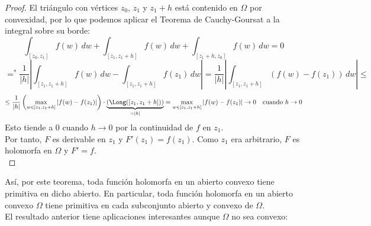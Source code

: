 \begin{proof}
    El triángulo con vértices $z_0$, $z_1$ y $z_1 + h$ está contenido en $\Omega$ por convexidad, por lo que podemos aplicar el Teorema de Cauchy-Goursat a la integral sobre su borde:
    \[
    \int_{[z_0, z_1]} f(w)\,dw + \int_{[z_1, z_1+h]} f(w)\,dw + \int_{[z_1+h, z_0]} f(w)\,dw = 0
    \]
    \[
        =^*
        \frac{1}{|h|} 
        \left|
        \int_{[z_1, z_1 + h]} f(w) \, dw -
        \int_{[z_1, z_1 + h]} f(z_1) \, dw
        \right| =
        \frac{1}{|h|}
        \left|
        \int_{[z_1, z_1 + h]} (f(w) - f(z_1)) \, dw
        \right| \leq
    \]
    \[
    \leq
    \frac{1}{|h|}
    \left(
        \max_{w \in [z_1, z_1 + h]} |f(w) - f(z_1)| 
    \right) \cdot
    \underbrace{\left(\Long ([z_1, z_1 + h])\right)}_{=|h|}
     =
    \max_{w \in [z_1, z_1 + h]} |f(w) - f(z_1)| \to 0 \quad \text{cuando } h \to 0
    \]
    Esto tiende a $0$ cuando $h \to 0$ por la continuidad de $f$ en $z_1$.\\
    Por tanto, $F$ es derivable en $z_1$ y $F'(z_1) = f(z_1)$. Como $z_1$ era arbitrario, $F$ es holomorfa en $\Omega$ y $F' = f$.\\
\end{proof}

Así, por este teorema, toda función holomorfa en un abierto convexo tiene primitiva en dicho abierto. En particular, toda función holomorfa en un abierto convexo $\Omega$ tiene primitiva en cada subconjunto abierto y convexo de $\Omega$.\\

El resultado anterior tiene aplicaciones interesantes aunque $\Omega$ no sea convexo:

